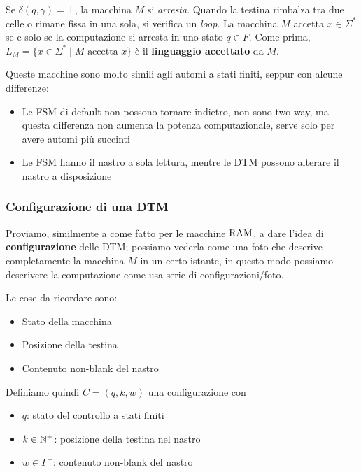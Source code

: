 Se $\delta(q, \gamma) = \bot$, la macchina $M$ si \textit{arresta}. Quando la testina rimbalza tra due celle o rimane fissa in una sola, si verifica un \textit{loop}. La macchina $M$ accetta $x \in \Sigma^\ast$ se e solo se la computazione si arresta in uno stato $q \in F$. Come prima, $L_M = \{x \in \Sigma^\ast \mid M \text{ accetta } x\}$ è il \textbf{linguaggio accettato} da $M$.

Queste macchine sono molto simili agli automi a stati finiti, seppur con alcune differenze: 
\begin{itemize}
	\item Le FSM di default non possono tornare indietro, non sono two-way, ma questa differenza non aumenta la potenza computazionale, serve solo per avere automi più succinti
	
    \item Le FSM hanno il nastro a sola lettura, mentre le DTM possono alterare il nastro a disposizione
\end{itemize}

\subsubsection{Configurazione di una DTM}

Proviamo, similmente a come fatto per le macchine $\text{RAM}$, a dare l'idea di \textbf{configurazione} delle DTM; possiamo vederla come una foto che descrive completamente la macchina $M$ in un certo istante, in questo modo possiamo descrivere la computazione come usa serie di configurazioni/foto.

Le cose da ricordare sono: 
\begin{itemize}
	\item Stato della macchina
	
    \item Posizione della testina
	
    \item Contenuto non-blank del nastro
\end{itemize}

Definiamo quindi $C = (q,k,w)$ una configurazione con
\begin{itemize}
	\item $q$: stato del controllo a stati finiti
    
	\item $k \in \mathbb{N}^+$: posizione della testina nel nastro
	
    \item $w \in \Gamma^+$: contenuto non-blank del nastro
\end{itemize}

